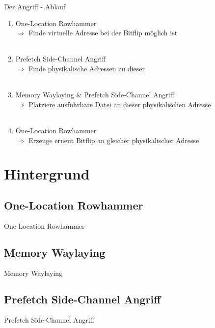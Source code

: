 \documentclass[german,10pt,xcolor=colortbl,compress
]{beamer}
\begin{document}
\begin{frame}{Der Angriff - Ablauf}

\begin{enumerate}
	\item One-Location Rowhammer\\
	$ \Rightarrow $ Finde virtuelle Adresse bei der Bitflip möglich ist\\~\\
	\pause
	\item Prefetch Side-Channel Angriff\\
	$ \Rightarrow $ Finde physikalische Adressen zu dieser\\~\\
	\pause
	\item Memory Waylaying \& Prefetch Side-Channel Angriff\\
	$ \Rightarrow $ Platziere ausführbare Datei an dieser physikalischen Adresse\\~\\
	\pause
	\item One-Location Rowhammer\\
	$ \Rightarrow $ Erzeuge erneut Bitflip an gleicher physikalischer Adresse
	
\end{enumerate}

\end{frame}


\section{Hintergrund}
\subsection{One-Location Rowhammer}
\begin{frame}{One-Location Rowhammer}

\end{frame}

\subsection{Memory Waylaying}
\begin{frame}{Memory Waylaying}


\end{frame}

\subsection{Prefetch Side-Channel Angriff}
\begin{frame}{Prefetch Side-Channel Angriff}

\end{frame}
\end{document}
